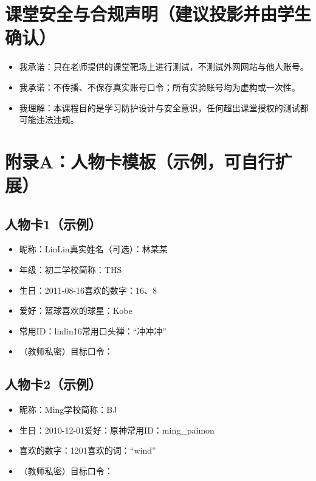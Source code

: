 \documentclass[UTF8,a4paper,12pt]{ctexart}
\begin{document}
\section{课堂安全与合规声明（建议投影并由学生确认）}
\begin{itemize}
  \item 我承诺：只在老师提供的课堂靶场上进行测试，不测试外网网站与他人账号。
  \item 我承诺：不传播、不保存真实账号口令；所有实验账号均为虚构或一次性。
  \item 我理解：本课程目的是学习防护设计与安全意识，任何超出课堂授权的测试都可能违法违规。
\end{itemize}

\appendix
\section{附录A：人物卡模板（示例，可自行扩展）}
\subsection*{人物卡1（示例）}
\begin{itemize}
  \item 昵称：LinLin\quad 真实姓名（可选）：林某某
  \item 年级：初二\quad 学校简称：THS
  \item 生日：2011-08-16\quad 喜欢的数字：16、8
  \item 爱好：篮球\quad 喜欢的球星：Kobe
  \item 常用ID：linlin16\quad 常用口头禅：``冲冲冲''
  \item （教师私密）目标口令：\underline{\hspace{10em}}
\end{itemize}

\subsection*{人物卡2（示例）}
\begin{itemize}
  \item 昵称：Ming\quad 学校简称：BJ
  \item 生日：2010-12-01\quad 爱好：原神\quad 常用ID：ming\_paimon
  \item 喜欢的数字：1201\quad 喜欢的词：``wind''
  \item （教师私密）目标口令：\underline{\hspace{10em}}
\end{itemize}
\end{document}
